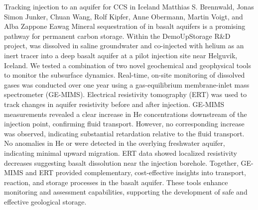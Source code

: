 \begin{conf-abstract}
{Tracking  injection to an aquifer for CCS in Iceland}
{Matthias S. Brennwald, Jonas Simon Junker, Chuan Wang, Rolf Kipfer, Anne Obermann, Martin Voigt, and Alba Zappone}
{Eawag}
{Mineral sequestration of  in basalt aquifers is a promising pathway for permanent carbon storage. Within the DemoUpStorage R\&D project,  was dissolved in saline groundwater and co-injected with helium as an inert tracer into a deep basalt aquifer at a pilot injection site near Helguvik, Iceland. We tested a combination of two novel geochemical and geophysical tools to monitor the subsurface  dynamics. Real-time, on-site monitoring of dissolved gases was conducted over one year using a gas-equilibrium membrane-inlet mass spectrometer (GE-MIMS). Electrical resistivity tomography (ERT) was used to track changes in aquifer resistivity before and after injection. GE-MIMS measurements revealed a clear increase in He concentrations downstream of the injection point, confirming fluid transport. However, no corresponding  increase was observed, indicating substantial  retardation relative to the fluid transport. No anomalies in He or  were detected in the overlying freshwater aquifer, indicating minimal upward migration. ERT data showed localized resistivity decreases suggesting basalt dissolution near the injection borehole. Together, GE-MIMS and ERT provided complementary, cost-effective insights into  transport, reaction, and storage processes in the basalt aquifer. These tools enhance monitoring and assessment capabilities, supporting the development of safe and effective geological  storage.}
\end{conf-abstract}
